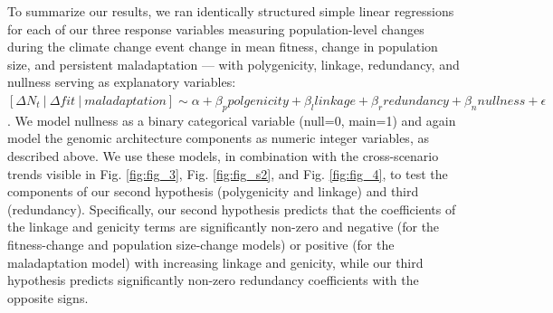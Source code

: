 \documentclass[9pt,twocolumn,twoside,lineno]{pnas-new}
\begin{document}
{To summarize our results,
we ran identically structured simple linear regressions
for each of our three response variables measuring
population-level changes during the climate change event
change in mean fitness, change in population size,
and persistent maladaptation --- with polygenicity,
linkage, redundancy, and nullness serving as explanatory variables:
$[\Delta N_{t}\ |\ \Delta fit\ |\ maladaptation] \sim \alpha + \beta_{p}polgenicity + \beta_{l}linkage + \beta_{r}redundancy + \beta_{n}nullness + \epsilon$.
We model nullness as a binary categorical variable (null=0, main=1)
and again model the genomic architecture components
as numeric integer variables, as described above.
We use these models, in combination with the
cross-scenario trends visible in
Fig. \ref{fig:fig_3}, Fig. \ref{fig:fig_s2}, and Fig. \ref{fig:fig_4},
to test the components of our second hypothesis
(polygenicity and linkage) and third (redundancy).
Specifically, our second hypothesis predicts that
the coefficients of the linkage and genicity terms are significantly
non-zero and negative (for the fitness-change
and population size-change models) or positive (for the maladaptation
model) with increasing linkage and genicity,
while our third hypothesis predicts significantly non-zero
redundancy coefficients with the opposite signs.

} %




\showmatmethods{} %


\showacknow{} %



\end{document}

